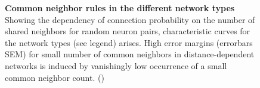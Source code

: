 \vspace{-0.25cm}
\begin{figure}[H]
  \centering
  \vfill
  \vspace{0.11cm}
  \vfill
  \vspace{0.11cm}
  \captionsetup{skip=7pt}
  \caption{\textbf{Common neighbor rules in the different network
      types} Showing the dependency of connection probability on the
    number of shared neighbors for random neuron pairs, characteristic
    curves for the network types (see legend) arises. High error
    margins (errorbars SEM) for small number of common neighbors in
    distance-dependent networks is induced by vanishingly low occurrence
    of a small common neighbor count. ()}
  \label{fig:cm_rule}
\end{figure}



